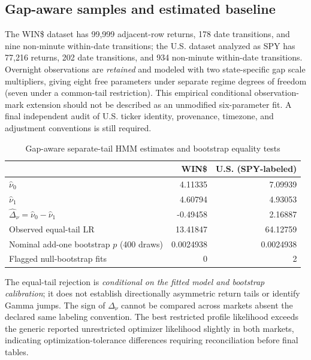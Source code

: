 \documentclass[11pt,a4paper]{article}
\begin{document}
\subsection{Gap-aware samples and estimated baseline}
The WIN\$ dataset has 99,999 adjacent-row returns, 178 date transitions, and nine non-minute within-date transitions; the U.S. dataset analyzed as SPY has 77,216 returns, 202 date transitions, and 934 non-minute within-date transitions. Overnight observations are \emph{retained} and modeled with two state-specific gap scale multipliers, giving eight free parameters under separate regime degrees of freedom (seven under a common-tail restriction). This empirical conditional observation-mark extension should not be described as an unmodified six-parameter fit. A final independent audit of U.S. ticker identity, provenance, timezone, and adjustment conventions is still required.
\begin{table}[htbp]\centering\caption{Gap-aware separate-tail HMM estimates and bootstrap equality tests}\label{tab:emp}
\begin{tabular}{lrr}\toprule & WIN\$ & U.S. (SPY-labeled)\\\midrule
$\widehat\nu_0$ & 4.11335 & 7.09939\\
$\widehat\nu_1$ & 4.60794 & 4.93053\\
$\widehat\Delta_\nu=\widehat\nu_0-\widehat\nu_1$ & -0.49458 & 2.16887\\
Observed equal-tail LR & 13.41847 & 64.12759\\
Nominal add-one bootstrap $p$ (400 draws) & 0.0024938 & 0.0024938\\
Flagged null-bootstrap fits & 0 & 2\\\bottomrule
\end{tabular}\end{table}
The equal-tail rejection is \emph{conditional on the fitted model and bootstrap calibration}; it does not establish directionally asymmetric return tails or identify Gamma jumps. The sign of $\Delta_\nu$ cannot be compared across markets absent the declared same labeling convention. The best restricted profile likelihood exceeds the generic reported unrestricted optimizer likelihood slightly in both markets, indicating optimization-tolerance differences requiring reconciliation before final tables.
\end{document}
